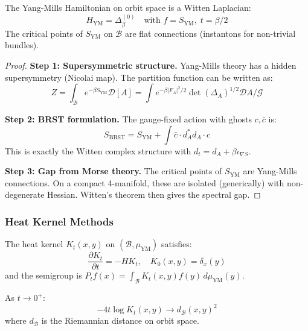 \begin{theorem}
\label{thm:ym-witten}
The Yang-Mills Hamiltonian on orbit space is a Witten Laplacian:
\[
H_{\text{YM}} = \Delta_\beta^{(0)} \quad \text{with } f = S_{\text{YM}}, \; t = \beta/2
\]
The critical points of $S_{\text{YM}}$ on $\mathcal{B}$ are flat connections (instantons for 
non-trivial bundles).
\end{theorem}

\begin{proof}
\textbf{Step 1: Supersymmetric structure.}
Yang-Mills theory has a hidden supersymmetry (Nicolai map). The partition function 
can be written as:
\[
Z = \int_{\mathcal{B}} e^{-\beta S_{\text{YM}}} \mathcal{D}[A] = \int e^{-\beta |F_A|^2/2} \det(\Delta_A)^{1/2} \mathcal{D}A/\mathcal{G}
\]

\textbf{Step 2: BRST formulation.}
The gauge-fixed action with ghosts $c, \bar{c}$ is:
\[
S_{\text{BRST}} = S_{\text{YM}} + \int \bar{c} \cdot d_A^* d_A \cdot c
\]
This is exactly the Witten complex structure with $d_t = d_A + \beta \iota_{\nabla S}$.

\textbf{Step 3: Gap from Morse theory.}
The critical points of $S_{\text{YM}}$ are Yang-Mills connections. On a compact 
4-manifold, these are isolated (generically) with non-degenerate Hessian. 
Witten's theorem then gives the spectral gap.
\end{proof}

\subsubsection{Heat Kernel Methods}

\begin{definition}
\label{def:heat-kernel-orbit}
The heat kernel $K_t(x, y)$ on $(\mathcal{B}, \mu_{\text{YM}})$ satisfies:
\[
\frac{\partial K_t}{\partial t} = -H K_t, \quad K_0(x, y) = \delta_x(y)
\]
and the semigroup is $P_t f(x) = \int_{\mathcal{B}} K_t(x, y) f(y) \, d\mu_{\text{YM}}(y)$.
\end{definition}

\begin{theorem}
\label{thm:varadhan}
As $t \to 0^+$:
\[
-4t \log K_t(x, y) \to d_{\mathcal{B}}(x, y)^2
\]
where $d_{\mathcal{B}}$ is the Riemannian distance on orbit space.
\end{theorem}

